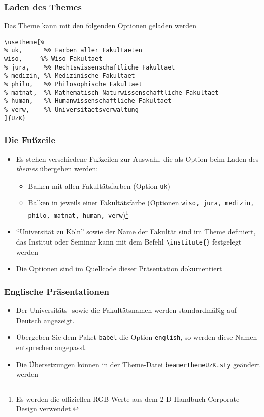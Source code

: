 \documentclass{beamer}
\begin{document}
\begin{frame}[fragile]
  \frametitle{Laden des Themes}
  \begin{block}{Das Theme kann mit den folgenden Optionen geladen werden}
    \begin{small}
\begin{verbatim}
\usetheme[%
% uk,      %% Farben aller Fakultaeten
wiso,     %% Wiso-Fakultaet
% jura,    %% Rechtswissenschaftliche Fakultaet
% medizin, %% Medizinische Fakultaet
% philo,   %% Philosophische Fakultaet
% matnat,  %% Mathematisch-Naturwissenschaftliche Fakultaet
% human,   %% Humanwissenschaftliche Fakultaet
% verw,    %% Universitaetsverwaltung
]{UzK}
\end{verbatim}
    \end{small}

  \end{block}
\end{frame}

\begin{frame}
  \frametitle{Die Fußzeile}

  \begin{itemize}
  \item Es stehen verschiedene Fußzeilen zur Auswahl, die als Option
    beim Laden des \emph{themes} übergeben werden:
    \begin{itemize}
    \item Balken mit allen Fakultätsfarben (Option \texttt{uk})
    \item Balken in jeweils einer Fakultätsfarbe (Optionen \texttt{wiso, jura,
        medizin, philo, matnat, human, verw})\footnote{Es werden die offiziellen
        RGB-Werte aus dem 2-D Handbuch Corporate Design verwendet.}
    \end{itemize}
  \item "`Universität zu Köln"' sowie der Name der Fakultät sind im
    Theme definiert, das Institut oder Seminar kann mit dem Befehl
    \texttt{\textbackslash institute\{\}} festgelegt werden
  \item Die Optionen sind im Quellcode dieser Präsentation dokumentiert
  \end{itemize}

\end{frame}

\begin{frame}
  \frametitle{Englische Präsentationen}
  \begin{itemize}
  \item Der Universitäts- sowie die Fakultätsnamen werden
    standardmäßig auf Deutsch angezeigt.
  \item Übergeben Sie dem Paket \texttt{babel} die Option
    \texttt{english}, so werden diese Namen entsprechen angepasst.
  \item Die Übersetzungen können in der Theme-Datei
    \texttt{beamerthemeUzK.sty} geändert werden
  \end{itemize}

\end{frame}
\end{document}
